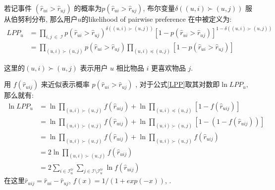 若记事件 $\left(\hat{r}_{ui} > \hat{r}_{uj}\right)$ 的概率为$p\left(\hat{r}_{ui} > \hat{r}_{uj}\right)$, 布尔变量$\delta\left(\left(u,i\right) \succ \left(u,j\right)\right)$ 服从伯努利分布, 那么用户$u$的likelihood of pairwise preference 在中被定义为:
\begin{equation}
\label{LPP}
\begin{aligned}
LPP_u  
&= \prod_{i,j \ \in \  \mathcal{I}}p\left(\hat{r}_{ui} > \hat{r}_{uj}\right)^{\delta\left(\left(u,i\right) \succ \left(u,j\right)\right)} \left[1-p\left(\hat{r}_{ui} > \hat{r}_{uj}\right)\right]^{1-\delta\left(\left(u,i\right) \succ \left(u,j\right)\right)}\\
&= \prod_{\left(u,i\right) \succ \left(u,j\right)}p\left(\hat{r}_{ui} > \hat{r}_{uj}\right)\prod_{\left(u,i\right) \preceq \left(u,j\right)}\left[1-p\left(\hat{r}_{ui} > \hat{r}_{uj}\right)\right]
\end{aligned}
\end{equation}

这里的$\left(u,i\right) \succ \left(u,j\right)$ 表示用户 $u$ 相比物品 $i$ 更喜欢物品 $j$.

用 $f \left(\hat{r}_{uij} \right)$ 来近似表示概率
$p\left(\hat{r}_{ui} > \hat{r}_{uj}\right)$ , 对于公式\ref{LPP}取其对数即$\ln LPP_u$, 那么就有:
\begin{equation}
\label{eq5}
\begin{aligned}
\ln LPP_u
&= \ln \prod_{\left(u,i\right) \succ \left(u,j\right)} f \left(\hat{r}_{uij}\right) + \ln \prod_{\left(u,i\right) \preceq \left(u,j\right)}\left[1- f \left(\hat{r}_{uij}\right)\right]\\
&= \ln \prod_{\left(u,i\right) \succ \left(u,j\right)} f \left(\hat{r}_{uij}\right) + \ln \prod_{\left(u,i\right) \succ \left(u,j\right)}\left[1-\left(1- f \left(\hat{r}_{uij}\right)\right)\right]\\
&= \ln \prod_{\left(u,i\right) \succ \left(u,j\right)} f \left(\hat{r}_{uij}\right) + \ln \prod_{\left(u,i\right) \succ \left(u,j\right)} f \left(\hat{r}_{uij}\right)\\
&= 2\ln \prod_{\left(u,i\right) \succ \left(u,j\right)} f \left(\hat{r}_{uij}\right)\\
&= 2 \sum_{i\in\mathcal{I}_u^{tr}}
\sum_{j \in \mathcal{I}\setminus \mathcal{I}_u^{tr}}\ln f \left(\hat{r}_{uij}\right)
\end{aligned}
\end{equation}
在这里$\hat{r}_{uij} = \hat{r}_{ui} - \hat{r}_{uj}$, $f \left(x\right) = 1/\left(1+exp\left(-x\right)\right)$, .


